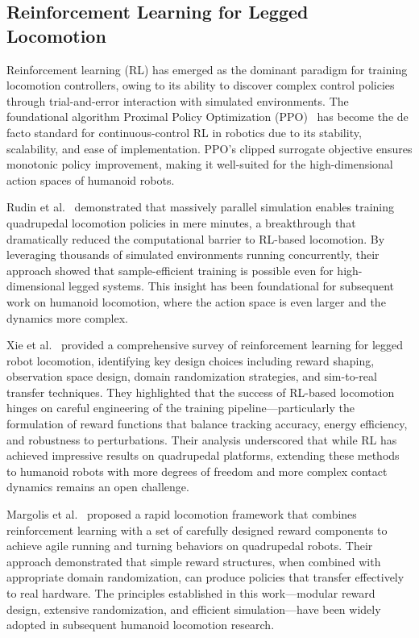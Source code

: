 \subsection{Reinforcement Learning for Legged Locomotion}

Reinforcement learning (RL) has emerged as the dominant paradigm for training locomotion controllers, owing to its ability to discover complex control policies through trial-and-error interaction with simulated environments. The foundational algorithm Proximal Policy Optimization (PPO)~\cite{schulman2017ppo} has become the de facto standard for continuous-control RL in robotics due to its stability, scalability, and ease of implementation. PPO's clipped surrogate objective ensures monotonic policy improvement, making it well-suited for the high-dimensional action spaces of humanoid robots.

Rudin et al.~\cite{rudin2016walk} demonstrated that massively parallel simulation enables training quadrupedal locomotion policies in mere minutes, a breakthrough that dramatically reduced the computational barrier to RL-based locomotion. By leveraging thousands of simulated environments running concurrently, their approach showed that sample-efficient training is possible even for high-dimensional legged systems. This insight has been foundational for subsequent work on humanoid locomotion, where the action space is even larger and the dynamics more complex.

Xie et al.~\cite{xie2024leggedlocomotion} provided a comprehensive survey of reinforcement learning for legged robot locomotion, identifying key design choices including reward shaping, observation space design, domain randomization strategies, and sim-to-real transfer techniques. They highlighted that the success of RL-based locomotion hinges on careful engineering of the training pipeline---particularly the formulation of reward functions that balance tracking accuracy, energy efficiency, and robustness to perturbations. Their analysis underscored that while RL has achieved impressive results on quadrupedal platforms, extending these methods to humanoid robots with more degrees of freedom and more complex contact dynamics remains an open challenge.

Margolis et al.~\cite{margolis2024rapidlocomotion} proposed a rapid locomotion framework that combines reinforcement learning with a set of carefully designed reward components to achieve agile running and turning behaviors on quadrupedal robots. Their approach demonstrated that simple reward structures, when combined with appropriate domain randomization, can produce policies that transfer effectively to real hardware. The principles established in this work---modular reward design, extensive randomization, and efficient simulation---have been widely adopted in subsequent humanoid locomotion research.

